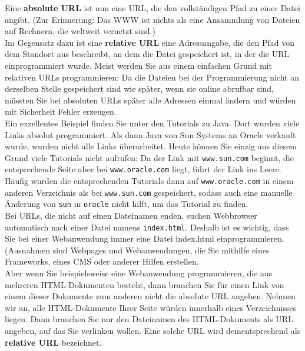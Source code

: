 Eine \textbf{absolute URL} ist nun eine URL, die den vollständigen Pfad zu einer Datei angibt. (Zur Erinnerung: Das WWW ist nichts als eine Ansammlung von Dateien auf Rechnern, die weltweit vernetzt sind.)\\

Im Gegensatz dazu ist eine \textbf{relative URL} eine Adressangabe, die den Pfad von dem Standort aus beschreibt, an dem die Datei gespeichert ist, in der die URL einprogrammiert wurde. Meist werden Sie aus einem einfachen Grund mit relativen URLs programmieren: Da die Dateien bei der Programmierung nicht an derselben Stelle gespeichert sind wie später, wenn sie online abrufbar sind, müssten Sie bei absoluten URLs später alle Adressen einmal ändern und würden mit Sicherheit Fehler erzeugen.\\

Ein \glqq{}exzellentes\grqq{} Beispiel finden Sie unter den Tutorials zu Java. Dort wurden viele Links absolut programmiert. Als dann Java von Sun Systems an Oracle verkauft wurde, wurden nicht alle Links überarbeitet. Heute können Sie einzig aus diesem Grund viele Tutorials nicht aufrufen: Da der Link mit \verb|www.sun.com| beginnt, die entsprechende Seite aber bei \verb|www.oracle.com| liegt, führt der Link ins Leere. Häufig wurden die entsprechenden Tutorials dann auf \verb|www.oracle.com| in einem anderen Verzeichnis als bei \verb|www.sun.com| gespeichert, sodass auch eine manuelle Änderung von \verb|sun| in \verb|oracle| nicht hilft, um das Tutorial zu finden.\\

Bei URLs, die nicht auf einen Dateinamen enden, suchen Webbrowser automatisch nach einer Datei namens \verb|index.html|. Deshalb ist es wichtig, dass Sie bei einer Webanwendung immer eine Datei index.html einprogrammieren. (Ausnahmen sind Webpages und Webanwendungen, die Sie mithilfe eines Frameworks, eines CMS oder anderer \glqq{}Hilfen\grqq{} erstellen.\\

Aber wenn Sie beispielsweise eine Webanwendung programmieren, die aus mehreren HTML-Dokumenten besteht, dann brauchen Sie für einen Link von einem dieser Dokumente zum anderen nicht die absolute URL angeben. Nehmen wir an, alle HTML-Dokumente Ihrer Seite würden innerhalb eines Verzeichnisses liegen. Dann brauchen Sie nur den Dateinamen des HTML-Dokuments als URL angeben, auf das Sie verlinken wollen. Eine solche URL wird dementsprechend als \textbf{relative URL} bezeichnet.\\

